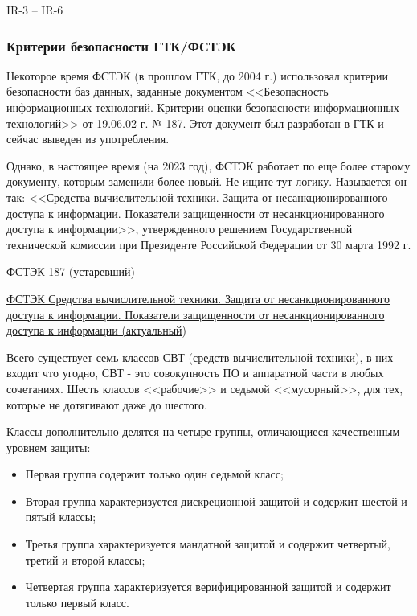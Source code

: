 \cite{PurpleBook} IR-3 -- IR-6

\subsubsection{Критерии безопасности ГТК/ФСТЭК}

Некоторое время ФСТЭК (в прошлом ГТК, до 2004 г.) использовал критерии безопасности баз данных, заданные документом <<Безопасность информационных технологий. Критерии оценки безопасности информационных технологий>> от 19.06.02 г. № 187. Этот документ был разработан в ГТК и сейчас выведен из употребления. \cite{GTK187}

Однако, в настоящее время (на 2023 год), ФСТЭК работает по еще более старому документу, которым заменили более новый. Не ищите тут логику. Называется он так:
<<Средства вычислительной техники. Защита от несанкционированного доступа к информации. Показатели защищенности от несанкционированного доступа к информации>>, утвержденного решением Государственной технической комиссии при Президенте Российской Федерации от 30 марта 1992 г.

\href{https://fstec.ru/component/attachments/download/293}{ФСТЭК 187 (устаревший)}

\href{https://fstec.ru/component/attachments/download/296}{ФСТЭК Средства вычислительной техники. Защита от несанкционированного доступа к информации. Показатели защищенности от несанкционированного доступа к информации (актуальный)}

Всего существует семь классов СВТ (средств вычислительной техники), в них входит что угодно, СВТ - это совокупность ПО и аппаратной части в любых сочетаниях. Шесть классов <<рабочие>> и седьмой <<мусорный>>, для тех, которые не дотягивают даже до шестого.

Классы дополнительно делятся на четыре группы, отличающиеся качественным уровнем защиты:
\begin{itemize}
	\item Первая группа содержит только один седьмой класс;
	\item Вторая группа характеризуется дискреционной защитой и содержит шестой и пятый классы;
	\item Третья группа характеризуется мандатной защитой и содержит четвертый, третий и второй классы;
	\item Четвертая группа характеризуется верифицированной защитой и содержит только первый класс.
\end{itemize}

